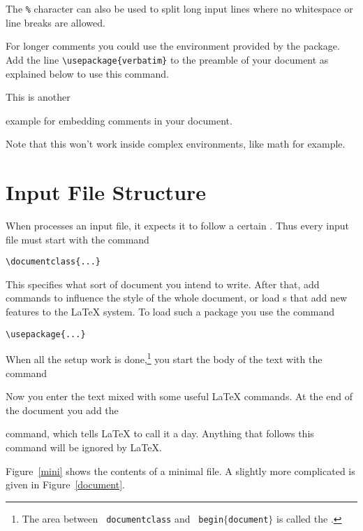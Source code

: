 The \texttt{\%} character can also be used to split long input lines where no
whitespace or line breaks are allowed.

For longer comments you could use the  environment
provided by the  package. Add the
line \verb|\usepackage{verbatim}| to the preamble of your document as
explained below to use this command.

\begin{example}
This is another
\begin{comment}
rather stupid,
but helpful
\end{comment}
example for embedding
comments in your document.
\end{example}

Note that this won't work inside complex environments, like math for example.

\section{Input File Structure}
\label{sec:structure}
When \LaTeXe{} processes an input file, it expects it to follow a
certain . Thus every input file must start with the
command
\begin{code}
\verb|\documentclass{...}|
\end{code}
This specifies what sort of document you intend to write. After that,
add commands to influence the style of the whole
document, or load s that add new
features to the \LaTeX{} system. To load such a package you use the
command
\begin{code}
\verb|\usepackage{...}|
\end{code}

When all the setup work is done,\footnote{The area between \texttt{\bs
    documentclass} and \texttt{\bs
    begin$\mathtt{\{}$document$\mathtt{\}}$} is called the
  \emph{}.} you start the body of the text with the
command

\begin{code}
\verb||
\end{code}

Now you enter the text mixed with some useful \LaTeX{} commands.  At
the end of the document you add the
\begin{code}
\verb||
\end{code}
command, which tells \LaTeX{} to call it a day. Anything that
follows this command will be ignored by \LaTeX.

Figure~\ref{mini} shows the contents of a minimal \LaTeXe{} file. A
slightly more complicated  is given in
Figure~\ref{document}.

